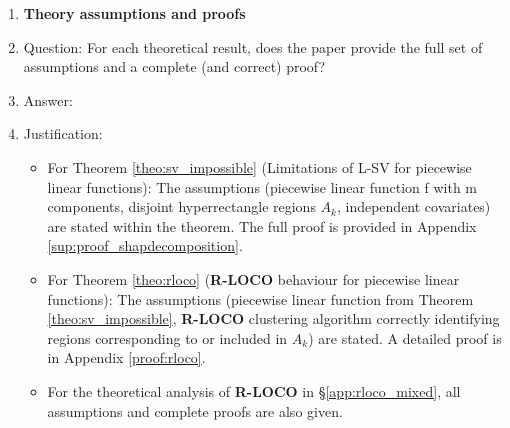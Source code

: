 \documentclass{article}
\theoremstyle{plain}
\theoremstyle{definition}
\theoremstyle{remark}
\newcommand{\ours}{\textcolor{ours}{\textbf{R-LOCO}}}
\begin{document}
\begin{enumerate}
\begin{itemize}
        \item The authors should reflect on the factors that influence the performance of the approach. For example, a facial recognition algorithm may perform poorly when image resolution is low or images are taken in low lighting. Or a speech-to-text system might not be used reliably to provide closed captions for online lectures because it fails to handle technical jargon.
        \item The authors should discuss the computational efficiency of the proposed algorithms and how they scale with dataset size.
        \item If applicable, the authors should discuss possible limitations of their approach to address problems of privacy and fairness.
        \item While the authors might fear that complete honesty about limitations might be used by reviewers as grounds for rejection, a worse outcome might be that reviewers discover limitations that aren't acknowledged in the paper. The authors should use their best judgment and recognize that individual actions in favor of transparency play an important role in developing norms that preserve the integrity of the community. Reviewers will be specifically instructed to not penalize honesty concerning limitations.
    \end{itemize}

\item {\bf Theory assumptions and proofs}
    \item[] Question: For each theoretical result, does the paper provide the full set of assumptions and a complete (and correct) proof?
    \item[] Answer: \answerYes{} %
    \item[] Justification: 
\begin{itemize}
    \item For Theorem \ref{theo:sv_impossible} (Limitations of L-SV for piecewise linear functions): The assumptions (piecewise linear function f with m components, disjoint hyperrectangle regions $A_k$, independent covariates) are stated within the theorem. The full proof is provided in Appendix \ref{sup:proof_shapdecomposition}.
    \item For Theorem \ref{theo:rloco} (\ours{} behaviour for piecewise linear functions): The assumptions (piecewise linear function from Theorem \ref{theo:sv_impossible}, \ours{} clustering algorithm correctly identifying regions corresponding to or included in $A_k$) are stated. A detailed proof is in Appendix \ref{proof:rloco}. 
    \item For the theoretical analysis of \ours{} in \S\ref{app:rloco_mixed}, all assumptions and complete proofs are also given.
\end{itemize}


\end{enumerate}
\end{document}
